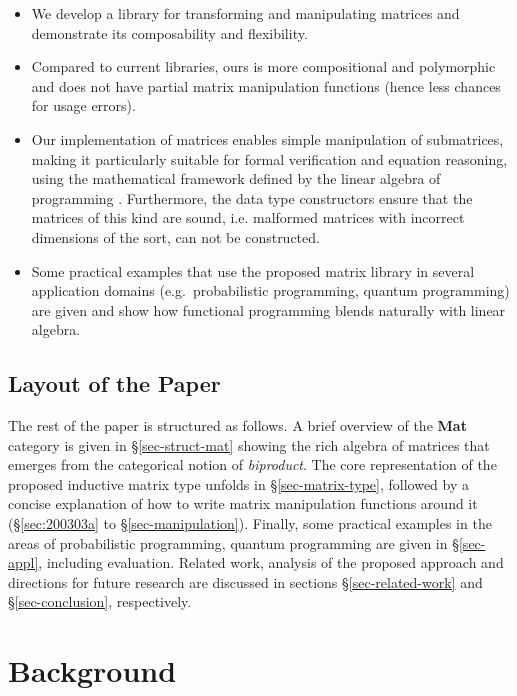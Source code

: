\documentclass[sigplan,screen]{acmart}
\begin{document}
\begin{itemize}
    \item We develop a library for transforming and manipulating matrices and demonstrate its composability and flexibility.
    \item Compared to current libraries, ours is more compositional and polymorphic and does not have partial matrix manipulation functions (hence less chances for usage errors). 
    \item Our implementation of matrices enables simple manipulation of submatrices, making it particularly suitable for formal verification and equation reasoning, using the mathematical framework defined by the linear algebra of programming \citep{oliveira2012towards}. Furthermore, the data type constructors ensure that the matrices of this kind are sound, i.e. malformed matrices with incorrect dimensions of the sort, can not be constructed.
    \item Some practical examples that use the proposed matrix library in several application domains (e.g.\ probabilistic programming, quantum programming) are given and show how functional programming blends naturally with linear algebra. 
\end{itemize}{}

\subsection{Layout of the Paper}

The rest of the paper is structured as follows. A brief overview of the \textbf{Mat} category is given in \S\ref{sec-struct-mat} showing the rich algebra of matrices that emerges from the categorical notion of \emph{biproduct}.
The core representation of the proposed inductive matrix type unfolds in \S\ref{sec-matrix-type}, followed by a concise explanation of how to write matrix manipulation functions around it (\S\ref{sec:200303a} to \S\ref{sec-manipulation}). Finally, some practical examples in the areas of probabilistic programming, quantum programming are given in \S\ref{sec-appl}, including evaluation. Related work, analysis of the proposed approach and directions for future research are discussed in sections \S\ref{sec-related-work} and \S\ref{sec-conclusion}, respectively.

\section{Background}\label{sec-motivation}
\end{document}
